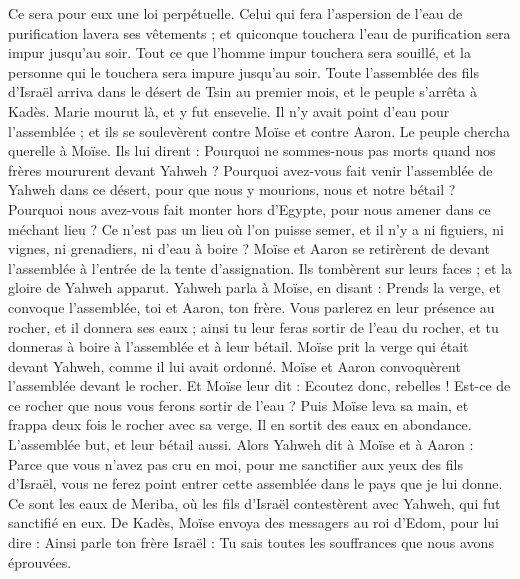 \begin{multicols}{2}
Ce sera pour eux une loi perpétuelle. Celui qui fera l'aspersion de l'eau de purification lavera ses vêtements ; et quiconque touchera l'eau de purification sera impur jusqu'au soir.
Tout ce que l'homme impur touchera sera souillé, et la personne qui le touchera sera impure jusqu'au soir.
\VerseOne{}Toute l'assemblée des fils d'Israël arriva dans le désert de Tsin au premier mois, et le peuple s'arrêta à Kadès. Marie mourut là, et y fut ensevelie.
Il n'y avait point d'eau pour l'assemblée ; et ils se soulevèrent contre Moïse et contre Aaron.
Le peuple chercha querelle à Moïse. Ils lui dirent : Pourquoi ne sommes-nous pas morts quand nos frères moururent devant Yahweh ?
Pourquoi avez-vous fait venir l'assemblée de Yahweh dans ce désert, pour que nous y mourions, nous et notre bétail ?
Pourquoi nous avez-vous fait monter hors d'Egypte, pour nous amener dans ce méchant lieu ? Ce n'est pas un lieu où l'on puisse semer, et il n'y a ni figuiers, ni vignes, ni grenadiers, ni d'eau à boire ?
Moïse et Aaron se retirèrent de devant l'assemblée à l'entrée de la tente d'assignation. Ils tombèrent sur leurs faces ; et la gloire de Yahweh apparut.
Yahweh parla à Moïse, en disant :
Prends la verge, et convoque l'assemblée, toi et Aaron, ton frère. Vous parlerez en leur présence au rocher, et il donnera ses eaux ; ainsi tu leur feras sortir de l'eau du rocher, et tu donneras à boire à l'assemblée et à leur bétail.
Moïse prit la verge qui était devant Yahweh, comme il lui avait ordonné.
Moïse et Aaron convoquèrent l'assemblée devant le rocher. Et Moïse leur dit : Ecoutez donc, rebelles ! Est-ce de ce rocher que nous vous ferons sortir de l'eau ?
Puis Moïse leva sa main, et frappa deux fois le rocher avec sa verge. Il en sortit des eaux en abondance. L'assemblée but, et leur bétail aussi.
Alors Yahweh dit à Moïse et à Aaron : Parce que vous n'avez pas cru en moi, pour me sanctifier aux yeux des fils d'Israël, vous ne ferez point entrer cette assemblée dans le pays que je lui donne.
Ce sont les eaux de Meriba, où les fils d'Israël contestèrent avec Yahweh, qui fut sanctifié en eux.
De Kadès, Moïse envoya des messagers au roi d'Edom, pour lui dire : Ainsi parle ton frère Israël : Tu sais toutes les souffrances que nous avons éprouvées.

\end{multicols}
